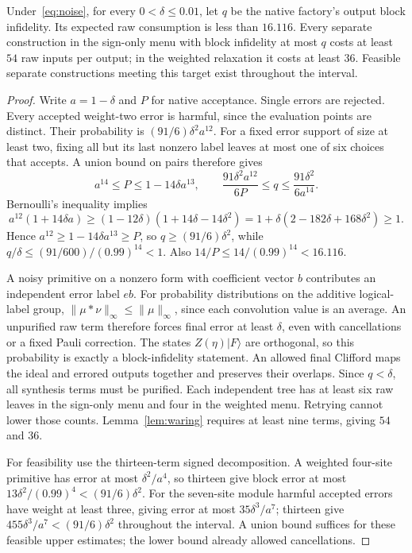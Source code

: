 \begin{theorem}\label{thm:factory}
Under~\eqref{eq:noise}, for every $0<\delta\leq0.01$, let $q$ be the
native factory's output block infidelity. Its expected raw consumption is
less than $16.116$. Every separate construction in the sign-only menu
with block infidelity at most $q$ costs at least $54$ raw inputs per output;
in the weighted relaxation it costs at least $36$.
Feasible separate constructions meeting this target exist throughout the interval.
\end{theorem}
\begin{proof}
Write $a=1-\delta$ and $P$ for native acceptance. Single errors are rejected.
Every accepted weight-two error is harmful, since the evaluation points are
distinct. Their probability is $(91/6)\delta^2a^{12}$.
For a fixed error support of size at least two, fixing all but its last
nonzero label leaves at most one of six choices that accepts. A union bound
on pairs therefore gives
\begin{equation}\label{eq:native-bounds}
 a^{14}\leq P\leq1-14\delta a^{13},\qquad
 \frac{91\delta^2a^{12}}{6P}\leq q\leq\frac{91\delta^2}{6a^{14}}.
\end{equation}
Bernoulli's inequality implies
\[
 a^{12}(1+14\delta a)\geq(1-12\delta)(1+14\delta-14\delta^2)
 =1+\delta(2-182\delta+168\delta^2)\geq1.
\]
Hence $a^{12}\geq1-14\delta a^{13}\geq P$,
so $q\geq(91/6)\delta^2$, while
$q/\delta\leq(91/600)/(0.99)^{14}<1$.
Also $14/P\leq14/(0.99)^{14}<16.116$.

A noisy primitive on a nonzero form with coefficient vector $b$ contributes
an independent error label $eb$. For probability distributions on the
additive logical-label group,
$\|\mu*\nu\|_\infty\leq\|\mu\|_\infty$, since each convolution value
is an average. An unpurified raw term therefore forces final error at least
$\delta$, even with cancellations or a fixed Pauli correction.
The states $Z(\eta)|F\rangle$ are orthogonal, so this probability is exactly
a block-infidelity statement. An allowed final Clifford maps the ideal and
errored outputs together and preserves their overlaps. Since $q<\delta$, all synthesis terms must
be purified. Each independent tree has at least six raw leaves in the
sign-only menu and four in the weighted menu. Retrying cannot lower those
counts. Lemma~\ref{lem:waring} requires at least nine terms, giving $54$
and $36$.

For feasibility use the thirteen-term signed decomposition. A weighted
four-site primitive has error at most $\delta^2/a^4$, so thirteen give
block error at most $13\delta^2/(0.99)^4<(91/6)\delta^2$.
For the seven-site module harmful accepted errors have weight at least three,
giving error at most $35\delta^3/a^7$; thirteen give
$455\delta^3/a^7<(91/6)\delta^2$ throughout the interval.
A union bound suffices for these feasible upper estimates; the lower bound
already allowed cancellations.
\end{proof}

